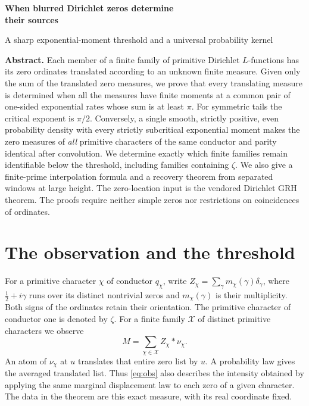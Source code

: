 \documentclass[11pt]{article}
\newcommand{\cX}{\mathcal X}
\begin{document}
\thispagestyle{plain}
\par
\vspace{.65em}
{\noindent\LARGE\bfseries\color{ink} When blurred Dirichlet zeros determine\\[2pt] their sources\par}
\vspace{.38em}
{\noindent\large A sharp exponential-moment threshold and a universal probability kernel\par}
\vspace{.45em}
\par
\vspace{.5em}
\noindent\textbf{Abstract.}
Each member of a finite family of primitive Dirichlet \(L\)-functions has its zero ordinates translated according to an unknown finite measure. Given only the sum of the translated zero measures, we prove that every translating measure is determined when all the measures have finite moments at a common pair of one-sided exponential rates whose sum is at least \(\pi\). For symmetric tails the critical exponent is \(\pi/2\). Conversely, a single smooth, strictly positive, even probability density with every strictly subcritical exponential moment makes the zero measures of \emph{all} primitive characters of the same conductor and parity identical after convolution. We determine exactly which finite families remain identifiable below the threshold, including families containing \(\zeta\). We also give a finite-prime interpolation formula and a recovery theorem from separated windows at large height. The zero-location input is the vendored Dirichlet GRH theorem. The proofs require neither simple zeros nor restrictions on coincidences of ordinates.

\section{The observation and the threshold}
For a primitive character \(\chi\) of conductor \(q_\chi\), write
\(Z_\chi=\sum_\gamma m_\chi(\gamma)\delta_\gamma\), where
\(\tfrac12+i\gamma\) runs over its distinct nontrivial zeros and
\(m_\chi(\gamma)\) is their multiplicity. Both signs of the ordinates retain their orientation.
The primitive character of conductor one is denoted by \(\zeta\).
For a finite family \(\cX\) of distinct primitive characters we observe
\begin{equation}\label{eq:obs}
             M=\sum_{\chi\in\cX} Z_\chi*\nu_\chi .
\end{equation}
An atom of \(\nu_\chi\) at \(u\) translates that entire zero list by \(u\).
A probability law gives the averaged translated list. Thus \eqref{eq:obs}
also describes the intensity obtained by applying the same marginal displacement law to each zero of a given character. The data in the theorem are this exact measure, with its real coordinate fixed.
\end{document}
